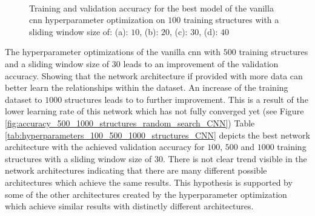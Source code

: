 \documentclass[conference]{IEEEtran}
\begin{document}
\begin{figure}[htp]
	\centering
	\quad
	\\
	\quad
	\caption{Training and validation accuracy for the best model of the vanilla \gls{cnn} hyperparameter optimization on $ 100 $ training structures with a sliding window size of: (a): $ 10 $, (b): $ 20 $, (c): $ 30 $, (d): $ 40 $}
	\label{fig:accuracy_100_structures_random_search_cnn}
\end{figure}

The hyperparameter optimizations of the vanilla \gls{cnn} with $ 500 $ training structures and a sliding window size of $ 30 $ leads to an improvement of the validation accuracy. Showing that the network architecture if provided with more data can better learn the relationships within the dataset. An increase of the training dataset to $ 1000 $ structures leads to to further improvement. This is a result of the lower learning rate of this network which has not fully converged yet (see Figure \ref{fig:accuracy_500_1000_structures_random_search_CNN})  Table \ref{tab:hyperparameters_100_500_1000_structures_CNN} depicts the best network architecture with the achieved validation accuracy for $ 100 $, $ 500 $ and $ 1000 $ training structures with a sliding window size of $ 30 $. There is not clear trend visible in the network architectures indicating that there are many different possible architectures which achieve the same results. This hypothesis is supported by some of the other architectures created by the hyperparameter optimization which achieve similar results with distinctly different architectures.
\end{document}

